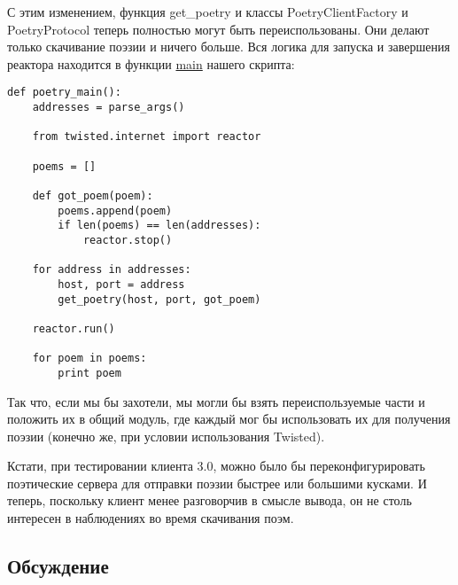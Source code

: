 С этим изменением, функция get\_poetry и классы PoetryClientFactory и 
PoetryProtocol теперь полностью могут быть переиспользованы. 
Они делают только скачивание поэзии и ничего больше. Вся логика для 
запуска и завершения реактора находится в функции 
\href{http://github.com/jdavisp3/twisted-intro/blob/master/twisted-client-3/get-poetry.py#L90}{main}  
нашего скрипта: 

 \begin{verbatim}
def poetry_main():
    addresses = parse_args()

    from twisted.internet import reactor

    poems = []

    def got_poem(poem):
        poems.append(poem)
        if len(poems) == len(addresses):
            reactor.stop()

    for address in addresses:
        host, port = address
        get_poetry(host, port, got_poem)

    reactor.run()

    for poem in poems:
        print poem
\end{verbatim} 


Так что, если мы бы захотели, мы могли бы взять переиспользуемые 
части и положить их в общий модуль, где каждый мог бы использовать 
их для получения поэзии (конечно же, при условии использования Twisted).


Кстати, при тестировании клиента 3.0, можно было бы 
переконфигурировать поэтические сервера для отправки 
поэзии быстрее или большими кусками. И теперь, поскольку клиент 
менее разговорчив в смысле вывода, он не столь интересен в 
наблюдениях во время скачивания поэм.


\subsection{Обсуждение}


